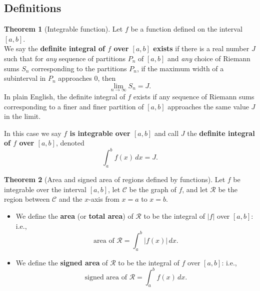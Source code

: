 \documentclass[11pt]{article}
\theoremstyle{definition}
\newtheorem*{comment}{Comment}
\theoremstyle{named}
\newtheorem*{namedtheorem}{Theorem}
\numberwithin{myalgctr}{section}
\begin{document}
\thispagestyle{fancy}
\subsection*{Definitions}
\begin{namedtheorem}[Integrable function] Let $f$ be a function defined on the interval $[a,b]$. \\
  We say the {\bf definite integral of $f$ over $[a,b]$ exists} if there is a real number $J$ such that for {\em any} sequence of partitions $P_n$ of $[a,b]$ and {\em any} choice of Riemann sums $S_n$ corresponding to the partitions $P_n$, if the maximum width of a subinterval in $P_n$ approaches 0, then
  \[
  \lim_{n\to\infty} S_n=J.
  \]
In plain English, the definite integral of $f$ exists if any sequence of Riemann sums corresponding to a finer and finer partition of $[a,b]$ approaches the same value $J$ in the limit.

In this case we say {\bf $f$ is integrable over $[a,b]$} and call $J$ the {\bf definite integral of $f$ over $[a,b]$}, denoted
\[
\int_a^bf(x)\, dx=J.
\]
\end{namedtheorem}
\begin{namedtheorem}[Area and signed area of regions defined by functions] Let $f$ be integrable over the interval $[a,b]$, let $\mathcal{C}$ be the graph of $f$, and let $\mathcal{R}$ be the region between $\mathcal{C}$ and the $x$-axis from $x=a$ to $x=b$.
\begin{itemize}
  \item We define the {\bf area} (or {\bf total area}) of $\mathcal{R}$ to be the integral of $\lvert f\rvert$ over $[a,b]$: i.e.,
  \[
  \text{area of $\mathcal{R}$}=\int_a^b\lvert f(x)\rvert\, dx.
  \]
  \item We define the {\bf signed area} of $\mathcal{R}$ to be the integral of $f$ over $[a,b]$: i.e.,
  \[
  \text{signed area of $\mathcal{R}$}=\int_a^b f(x)\, dx.
  \]
\end{itemize}


\end{namedtheorem}
\begin{comment}
  Let $f$ be integrable over the interval $[a,b]$, let $\mathcal{C}$ be the graph of $f$, and let $\mathcal{R}$ be the region between $\mathcal{C}$ and the $x$-axis from $x=a$ to $x=b$.
\begin{enumerate}
  \item The area of $\mathcal{R}$ is always nonnegative, since $\lvert f(x)\rvert\geq 0$ for all $x\in [a,b]$.
  \item If $f(x)\geq 0$ for all $x\in [a,b]$, then $f=\lvert f\rvert$ over $[a,b]$, and hence
  \[
  \text{area of $\mathcal{R}$}=\int_a^b f(x)\, dx
  \]
  in this case.
  \item Suppose $[a,b]$ can be partitioned into finitely many intervals over which $f$ is either always nonnegative ($\geq 0$) or always nonpositive ($\leq 0$). Then
  \[
  \text{signed area of $\mathcal{R}$}=\int_a^b f(x)\, dx=(\text{area of regions where $f\geq 0$})-(\text{area of regions where $f\leq 0$}).
  \]
\end{enumerate}
\end{comment}
\end{document}
